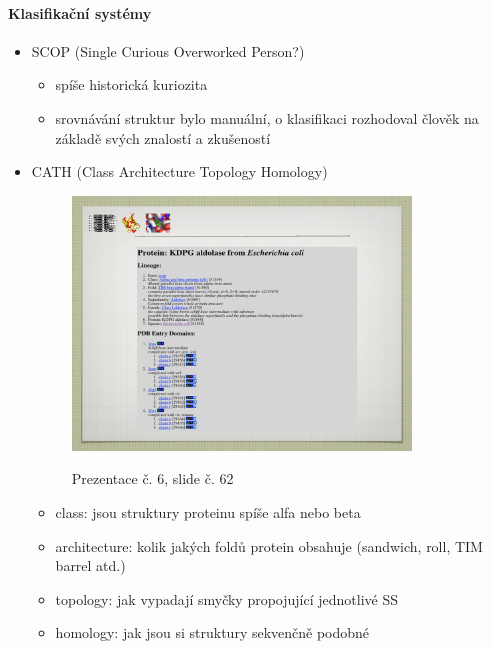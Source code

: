 \documentclass[DIV=8]{scrreprt}
\begin{document}
\paragraph{Klasifikační systémy}
\begin{itemize}[nosep]
    \item SCOP (Single Curious Overworked Person?)
\begin{itemize}[nosep]
    \item spíše historická kuriozita
    \item srovnávání struktur bylo manuální, o klasifikaci rozhodoval člověk na základě svých znalostí a zkušeností
\end{itemize}

    \item CATH (Class Architecture Topology Homology) \begin{figure}
    \caption{Prezentace č. 6, slide č. 62}
    \includegraphics[width=0.85\textwidth]{slides-6/slide-62.jpg}
    \centering
    \label{slides-6-slide-62}
\end{figure}

\begin{itemize}[nosep]
    \item class: jsou struktury proteinu spíše alfa nebo beta
    \item architecture: kolik jakých foldů protein obsahuje (sandwich, roll, TIM barrel atd.)
    \item topology: jak vypadají smyčky propojující jednotlivé SS
    \item homology: jak jsou si struktury sekvenčně podobné
\end{itemize}

\end{itemize}
\end{document}
